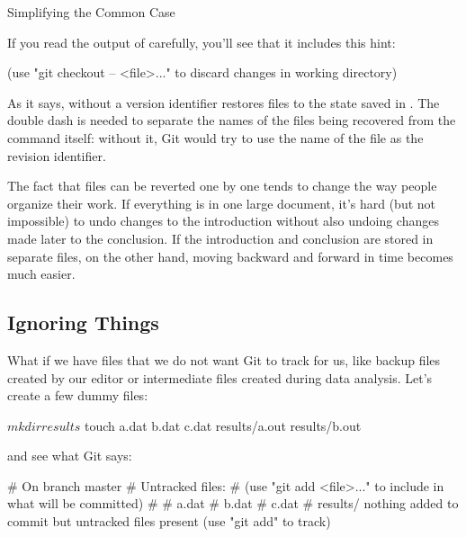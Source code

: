 
\begin{swcbox}{Simplifying the Common Case}

If you read the output of  carefully, you'll see that
it includes this hint:

\begin{VerbOut}
(use "git checkout -- <file>..." to discard changes in working directory)
\end{VerbOut}

As it says,  without a version identifier restores
files to the state saved in . The double dash \code{-{}-}
is needed to separate the names of the files being recovered from the
command itself: without it, Git would try to use the name of the file as
the revision identifier.

\end{swcbox}

The fact that files can be reverted one by one tends to change the way
people organize their work. If everything is in one large document, it's
hard (but not impossible) to undo changes to the introduction without
also undoing changes made later to the conclusion. If the introduction
and conclusion are stored in separate files, on the other hand, moving
backward and forward in time becomes much easier.

\subsection*{Ignoring Things}

What if we have files that we do not want Git to track for us, like
backup files created by our editor or intermediate files created during
data analysis. Let's create a few dummy files:

\begin{VerbIn}
$ mkdir results
$ touch a.dat b.dat c.dat results/a.out results/b.out
\end{VerbIn}

and see what Git says:


\begin{VerbOut}
# On branch master
# Untracked files:
#   (use "git add <file>..." to include in what will be committed)
#
#   a.dat
#   b.dat
#   c.dat
#   results/
nothing added to commit but untracked files present (use "git add" to track)
\end{VerbOut}

